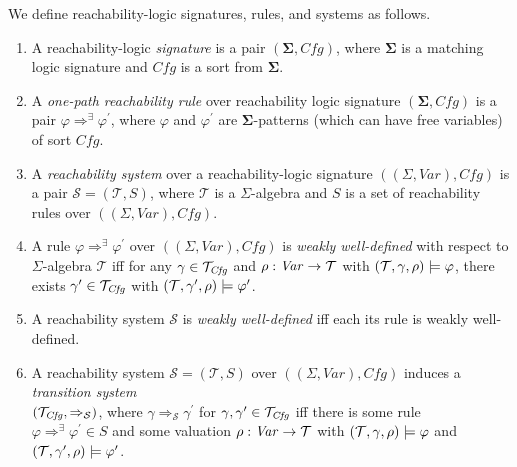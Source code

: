 \begin{definition}\label{def:basics}
We define reachability-logic signatures, rules, and systems as follows.
\begin{enumerate}
    \item A reachability-logic \emph{signature} is a pair $(\mathbf{\Sigma}, \mathit{Cfg})$,
          where $\mathbf{\Sigma}$ is a matching logic signature and $\mathit{Cfg}$ is a sort from $\mathbf{\Sigma}$.
          
    \item A \emph{one-path reachability rule} over reachability logic signature $(\mathbf{\Sigma}, \mathit{Cfg})$        is a pair $\varphi \Rightarrow^\exists \varphi^\prime$,
          where $\varphi$ and $\varphi^\prime$
          are $\mathbf{\Sigma}$-patterns (which can have free variables) of sort $\mathit{Cfg}$.
          
    \item A \emph{reachability system} over a reachability-logic signature $((\Sigma, \mathit{Var}), \mathit{Cfg})$
          is a pair $\mathcal{S} = (\mathcal{T}, S)$, where $\mathcal{T}$ is a $\Sigma$-algebra
          and $S$ is a set of reachability rules over $((\Sigma, \mathit{Var}), \mathit{Cfg})$.
          
    \item A rule $\varphi \Rightarrow^\exists \varphi^\prime$ over $((\Sigma, \mathit{Var}), \mathit{Cfg})$
          is \emph{weakly well-defined}
          with respect to $\Sigma$-algebra $\mathcal{T}$
          iff
          for any $\gamma \in \mathcal{T}_{\mathit{Cfg}}$ and $\rho : \mathit{Var} \to \mathcal{T}$
          with $(\mathcal{T}, \gamma, \rho) \models \varphi$,
          there exists $\gamma^\prime \in \mathcal{T}_{\mathit{Cfg}}$ with $(\mathcal{T}, \gamma^\prime , \rho) \models \varphi^\prime$.
          
    \item A reachability system $\mathcal{S}$ is \emph{weakly well-defined} iff each its rule is weakly     
          well-defined.
          
    \item A reachability system $\mathcal{S} = (\mathcal{T}, S)$ over $((\Sigma, \mathit{Var}), \mathit{Cfg})$ induces
          a \emph{transition system} \\
          $(\mathcal{T}_{\mathit{Cfg}} , \Rightarrow_{\mathcal{S}})$,
          where $\gamma \Rightarrow_{\mathcal{S}} \gamma^\prime$
          for $\gamma, \gamma^\prime \in \mathcal{T}_{\mathit{Cfg}}$
          iff there is some rule \\ $\varphi \Rightarrow^\exists \varphi^\prime \in S$
          and some valuation $\rho : \mathit{Var} \to \mathcal{T}$ with $(\mathcal{T}, \gamma, \rho) \models \varphi$
          and $(\mathcal{T}, \gamma^\prime , \rho) \models \varphi^\prime$.


\end{enumerate}
\end{definition}
